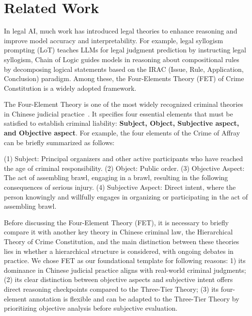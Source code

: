 \section{Related Work}
In legal AI, much work has introduced legal theories to enhance reasoning and improve model accuracy and interpretability. For example, legal syllogism prompting (LoT)\cite{jiang2023legal} teaches LLMs for legal judgment prediction by instructing legal syllogism, Chain of Logic\cite{servantez2024chain} guides models in reasoning about compositional rules by decomposing logical statements based on the IRAC (Issue, Rule, Application, Conclusion) paradigm.  Among these, the Four-Elements Theory (FET) of Crime Constitution is a widely adopted framework\cite{yuan2024can,deng2023syllogistic}.

The Four-Element Theory is one of the most widely recognized criminal theories in Chinese judicial practice~\cite{liang2017vicissitudes}. It specifies four essential elements that must be satisfied to establish criminal liability: \textbf{Subject, Object, Subjective aspect, and Objective aspect}. For example, the four elements of the Crime of Affray can be briefly summarized as follows:

(1) Subject: Principal organizers and other active participants who have reached the age of criminal responsibility. (2) Object: Public order. (3) Objective Aspect: The act of assembling brawl, engaging in a brawl, resulting in the following consequences of serious injury. (4) Subjective Aspect: Direct intent, where the person knowingly and willfully engages in organizing or participating in the act of assembling brawl.

Before discussing the Four-Element Theory (FET), it is necessary to briefly compare it with another key theory in Chinese criminal law, the Hierarchical Theory of Crime Constitution\cite{zhou2017hierarchical, zhang2010justification}, and the main distinction between these theories lies in whether a hierarchical structure is considered, with ongoing debates in practice\cite{gao2009rationality, chen2010crime, chen2017comparative, zhou2017debate}. We chose FET as our foundational template for following reasons: 1) its dominance in Chinese judicial practice aligns with real-world criminal judgments; (2) its clear distinction between objective aspects and subjective intent offers direct reasoning checkpoints compared to the Three-Tier Theory; (3) its four-element annotation is flexible and can be adapted to the Three-Tier Theory by prioritizing objective analysis before subjective evaluation\cite{li2006no_reconstruction, zhang2017judicial}.

